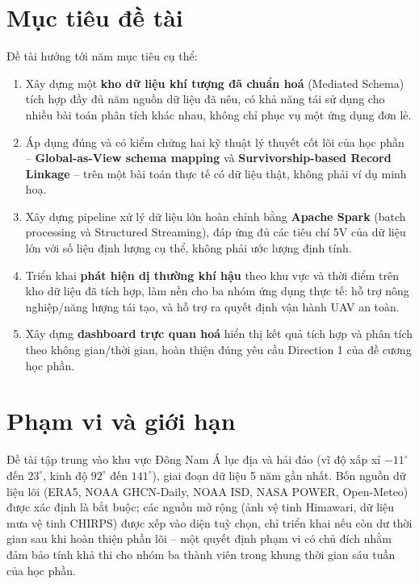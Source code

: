 \documentclass[12pt,a4paper]{report}
\begin{document}
\section{Mục tiêu đề tài}

Đề tài hướng tới năm mục tiêu cụ thể:

\begin{enumerate}
    \item Xây dựng một \textbf{kho dữ liệu khí tượng đã chuẩn hoá} (Mediated Schema) tích hợp đầy đủ năm nguồn dữ liệu đã nêu, có khả năng tái sử dụng cho nhiều bài toán phân tích khác nhau, không chỉ phục vụ một ứng dụng đơn lẻ.
    \item Áp dụng đúng và có kiểm chứng hai kỹ thuật lý thuyết cốt lõi của học phần -- \textbf{Global-as-View schema mapping} và \textbf{Survivorship-based Record Linkage} -- trên một bài toán thực tế có dữ liệu thật, không phải ví dụ minh hoạ.
    \item Xây dựng pipeline xử lý dữ liệu lớn hoàn chỉnh bằng \textbf{Apache Spark} (batch processing và Structured Streaming), đáp ứng đủ các tiêu chí 5V của dữ liệu lớn với số liệu định lượng cụ thể, không phải ước lượng định tính.
    \item Triển khai \textbf{phát hiện dị thường khí hậu} theo khu vực và thời điểm trên kho dữ liệu đã tích hợp, làm nền cho ba nhóm ứng dụng thực tế: hỗ trợ nông nghiệp/năng lượng tái tạo, và hỗ trợ ra quyết định vận hành UAV an toàn.
    \item Xây dựng \textbf{dashboard trực quan hoá} hiển thị kết quả tích hợp và phân tích theo không gian/thời gian, hoàn thiện đúng yêu cầu Direction 1 của đề cương học phần.
\end{enumerate}

\section{Phạm vi và giới hạn}

Đề tài tập trung vào khu vực Đông Nam Á lục địa và hải đảo (vĩ độ xấp xỉ $-11^\circ$ đến $23^\circ$, kinh độ $92^\circ$ đến $141^\circ$), giai đoạn dữ liệu 5 năm gần nhất. Bốn nguồn dữ liệu lõi (ERA5, NOAA GHCN-Daily, NOAA ISD, NASA POWER, Open-Meteo) được xác định là bắt buộc; các nguồn mở rộng (ảnh vệ tinh Himawari, dữ liệu mưa vệ tinh CHIRPS) được xếp vào diện tuỳ chọn, chỉ triển khai nếu còn dư thời gian sau khi hoàn thiện phần lõi -- một quyết định phạm vi có chủ đích nhằm đảm bảo tính khả thi cho nhóm ba thành viên trong khung thời gian sáu tuần của học phần.
\end{document}
